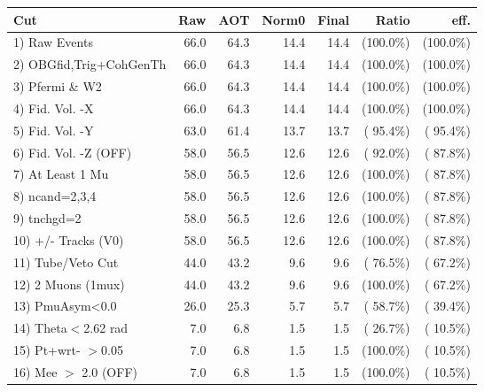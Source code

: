  \begin{table}[h!]\centering
 \begin{tabular}{||l||r|r|r|r|r|r||}
 \hline
 \hline
 Cut & Raw & AOT & Norm0 & Final & Ratio & eff.       \\
 \hline
  1) Raw Events           &         66.0 &         64.3 &         14.4 &         14.4 & (100.0\%) & (100.0\%) \\
  2) OBGfid,Trig+CohGenTh &         66.0 &         64.3 &         14.4 &         14.4 & (100.0\%) & (100.0\%) \\
  3) Pfermi \& W2         &         66.0 &         64.3 &         14.4 &         14.4 & (100.0\%) & (100.0\%) \\
  4) Fid. Vol. -X         &         66.0 &         64.3 &         14.4 &         14.4 & (100.0\%) & (100.0\%) \\
  5) Fid. Vol. -Y         &         63.0 &         61.4 &         13.7 &         13.7 & ( 95.4\%) & ( 95.4\%) \\
  6) Fid. Vol. -Z (OFF)   &         58.0 &         56.5 &         12.6 &         12.6 & ( 92.0\%) & ( 87.8\%) \\
  7) At Least 1 Mu        &         58.0 &         56.5 &         12.6 &         12.6 & (100.0\%) & ( 87.8\%) \\
  8) ncand=2,3,4          &         58.0 &         56.5 &         12.6 &         12.6 & (100.0\%) & ( 87.8\%) \\
  9) tnchgd=2             &         58.0 &         56.5 &         12.6 &         12.6 & (100.0\%) & ( 87.8\%) \\
 10) +/- Tracks (V0)      &         58.0 &         56.5 &         12.6 &         12.6 & (100.0\%) & ( 87.8\%) \\
 11) Tube/Veto Cut        &         44.0 &         43.2 &          9.6 &          9.6 & ( 76.5\%) & ( 67.2\%) \\
 12) 2 Muons (1mux)       &         44.0 &         43.2 &          9.6 &          9.6 & (100.0\%) & ( 67.2\%) \\
 13) PmuAsym<0.0          &         26.0 &         25.3 &          5.7 &          5.7 & ( 58.7\%) & ( 39.4\%) \\
 14) Theta$<$2.62 rad     &          7.0 &          6.8 &          1.5 &          1.5 & ( 26.7\%) & ( 10.5\%) \\
 15) Pt+wrt- $>$0.05      &          7.0 &          6.8 &          1.5 &          1.5 & (100.0\%) & ( 10.5\%) \\
 16) Mee $>$ 2.0  (OFF)   &          7.0 &          6.8 &          1.5 &          1.5 & (100.0\%) & ( 10.5\%) \\

\end{tabular}
\end{table}
